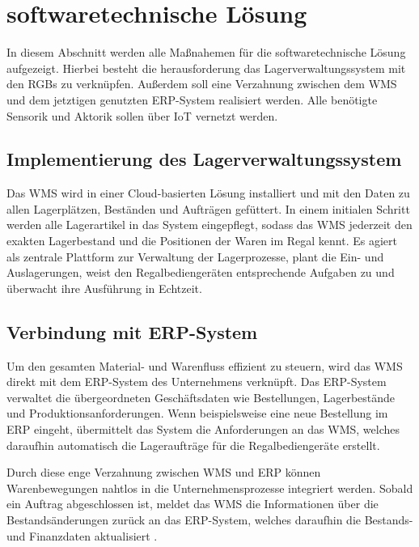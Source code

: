\section{softwaretechnische Lösung}
In diesem Abschnitt werden alle Maßnahemen für die softwaretechnische Lösung aufgezeigt. Hierbei besteht die herausforderung das Lagerverwaltungssystem mit den RGBs zu verknüpfen. Außerdem soll eine Verzahnung zwischen dem WMS und dem jetztigen genutzten ERP-System realisiert werden. Alle benötigte Sensorik und Aktorik sollen über IoT vernetzt werden.
\subsection{Implementierung des Lagerverwaltungssystem}
Das WMS wird in einer Cloud-basierten Lösung installiert und mit den Daten zu allen Lagerplätzen, Beständen und Aufträgen gefüttert. In einem initialen Schritt werden alle Lagerartikel in das System eingepflegt, sodass das WMS jederzeit den exakten Lagerbestand und die Positionen der Waren im Regal kennt. Es agiert als zentrale Plattform zur Verwaltung der Lagerprozesse, plant die Ein- und Auslagerungen, weist den Regalbediengeräten entsprechende Aufgaben zu und überwacht ihre Ausführung in Echtzeit\autocites{wehking_technisches_2020}.

\subsection{Verbindung mit ERP-System}
Um den gesamten Material- und Warenfluss effizient zu steuern, wird das WMS direkt mit dem ERP-System des Unternehmens verknüpft. Das ERP-System verwaltet die übergeordneten Geschäftsdaten wie Bestellungen, Lagerbestände und Produktionsanforderungen. Wenn beispielsweise eine neue Bestellung im ERP eingeht, übermittelt das System die Anforderungen an das WMS, welches daraufhin automatisch die Lageraufträge für die Regalbediengeräte erstellt.

Durch diese enge Verzahnung zwischen WMS und ERP können Warenbewegungen nahtlos in die Unternehmensprozesse integriert werden. Sobald ein Auftrag abgeschlossen ist, meldet das WMS die Informationen über die Bestandsänderungen zurück an das ERP-System, welches daraufhin die Bestands- und Finanzdaten aktualisiert \autocites{sarferaz_erp-marktanalyse_2023}.


